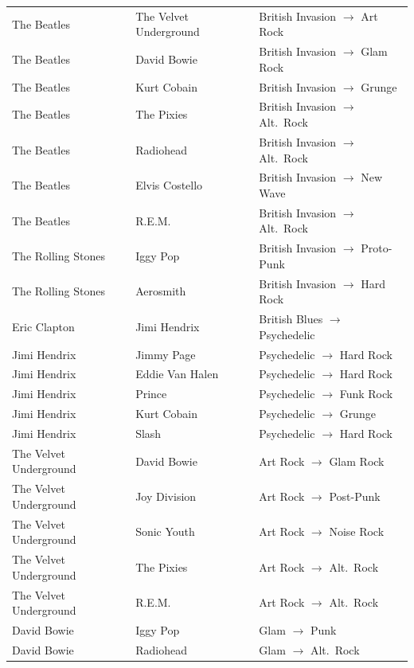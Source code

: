 \documentclass[12pt, a4paper]{article}
\begin{document}
\begin{longtable}{p{4.2cm} p{4.2cm} p{3cm}}
The Beatles         & The Velvet Underground & British Invasion $\to$ Art Rock \\
The Beatles         & David Bowie            & British Invasion $\to$ Glam Rock \\
The Beatles         & Kurt Cobain            & British Invasion $\to$ Grunge \\
The Beatles         & The Pixies             & British Invasion $\to$ Alt.\ Rock \\
The Beatles         & Radiohead              & British Invasion $\to$ Alt.\ Rock \\
The Beatles         & Elvis Costello         & British Invasion $\to$ New Wave \\
The Beatles         & R.E.M.                 & British Invasion $\to$ Alt.\ Rock \\
The Rolling Stones  & Iggy Pop               & British Invasion $\to$ Proto-Punk \\
The Rolling Stones  & Aerosmith              & British Invasion $\to$ Hard Rock \\
Eric Clapton        & Jimi Hendrix           & British Blues $\to$ Psychedelic \\
Jimi Hendrix        & Jimmy Page             & Psychedelic $\to$ Hard Rock \\
Jimi Hendrix        & Eddie Van Halen        & Psychedelic $\to$ Hard Rock \\
Jimi Hendrix        & Prince                 & Psychedelic $\to$ Funk Rock \\
Jimi Hendrix        & Kurt Cobain            & Psychedelic $\to$ Grunge \\
Jimi Hendrix        & Slash                  & Psychedelic $\to$ Hard Rock \\
The Velvet Underground & David Bowie         & Art Rock $\to$ Glam Rock \\
The Velvet Underground & Joy Division        & Art Rock $\to$ Post-Punk \\
The Velvet Underground & Sonic Youth         & Art Rock $\to$ Noise Rock \\
The Velvet Underground & The Pixies          & Art Rock $\to$ Alt.\ Rock \\
The Velvet Underground & R.E.M.              & Art Rock $\to$ Alt.\ Rock \\
David Bowie         & Iggy Pop               & Glam $\to$ Punk \\
David Bowie         & Radiohead              & Glam $\to$ Alt.\ Rock \\

\end{longtable}
\end{document}
